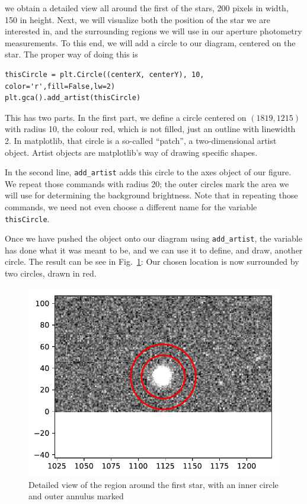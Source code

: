 \documentclass[twocolumn,apj]{openjournal}
\begin{document}
we obtain a detailed view all around the first of the stars, 200 pixels in width, 150 in height. Next, we will visualize both the position of the star we are interested in, and the surrounding regions we will use in our aperture photometry measurements. To this end, we will add a circle to our diagram, centered on the star. The proper way of doing this is 
\begin{lstlisting}
thisCircle = plt.Circle((centerX, centerY), 10, color='r',fill=False,lw=2)
plt.gca().add_artist(thisCircle)
\end{lstlisting}
This has two parts. In the first part, we define a circle centered on $(1819, 1215)$ with radius 10, the colour red, which is not filled, just an outline with linewidth 2. In matplotlib, that circle is a so-called ``patch'', a two-dimensional artist object. Artist objects are matplotlib's way of drawing specific shapes.

In the second line, \verb|add_artist| adds this circle to the axes object of our figure. We repeat those commands with radius 20; the outer circles mark the area we will use for determining the background brightness. Note that in repeating those commands, we need not even choose a different name for the variable \verb|thisCircle|. 

Once we have pushed the object onto our diagram using \verb|add_artist|, the variable has done what it was meant to be, and we can use it to define, and draw, another circle. The result can be see in Fig.~\ref{mplCircle}: Our chosen location is now surrounded by two circles, drawn in red. 
\begin{figure}[htbp]
\begin{center}
\includegraphics[width=\linewidth]{sdss-py-circles.pdf}
\caption{Detailed view of the region around the first star, with an inner circle and outer annulus marked}
\label{mplCircle}
\end{center}
\end{figure}
\end{document}
